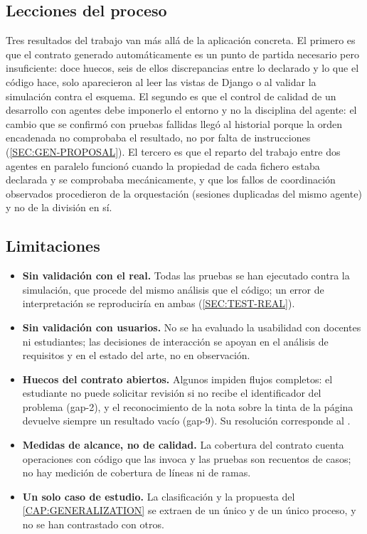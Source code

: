 \subsection{Lecciones del proceso}

Tres resultados del trabajo van más allá de la aplicación concreta. El primero es que el
contrato generado automáticamente es un punto de partida necesario pero insuficiente: doce
huecos, seis de ellos discrepancias entre lo declarado y lo que el código hace, solo
aparecieron al leer las vistas de Django o al validar la simulación contra el esquema. El
segundo es que el control de calidad de un desarrollo con agentes debe imponerlo el entorno
y no la disciplina del agente: el cambio que se confirmó con pruebas fallidas llegó al
historial porque la orden encadenada no comprobaba el resultado, no por falta de
instrucciones (\cref{SEC:GEN-PROPOSAL}). El tercero es
que el reparto del trabajo entre dos agentes en paralelo funcionó cuando la propiedad de cada
fichero estaba declarada y se comprobaba mecánicamente, y que los fallos de coordinación
observados procedieron de la orquestación (sesiones duplicadas del mismo agente) y no de la
división en sí.

\subsection{Limitaciones}

\begin{itemize}
  \item \textbf{Sin validación con el  real.} Todas las pruebas se han ejecutado
        contra la simulación, que procede del mismo análisis que el código; un error de
        interpretación se reproduciría en ambas (\cref{SEC:TEST-REAL}).
  \item \textbf{Sin validación con usuarios.} No se ha evaluado la usabilidad con docentes
        ni estudiantes; las decisiones de interacción se apoyan en el análisis de requisitos
        y en el estado del arte, no en observación.
  \item \textbf{Huecos del contrato abiertos.} Algunos impiden flujos completos: el
        estudiante no puede solicitar revisión si no recibe el identificador del problema
        (gap-2), y el reconocimiento de la nota sobre la tinta de la página devuelve
        siempre un resultado vacío (gap-9). Su resolución corresponde al .
  \item \textbf{Medidas de alcance, no de calidad.} La cobertura del contrato cuenta
        operaciones con código que las invoca y las pruebas son recuentos de casos; no hay
        medición de cobertura de líneas ni de ramas.
  \item \textbf{Un solo caso de estudio.} La clasificación y la propuesta del
        \cref{CAP:GENERALIZATION} se extraen de un único  y de un único
        proceso, y no se han contrastado con otros.
\end{itemize}


